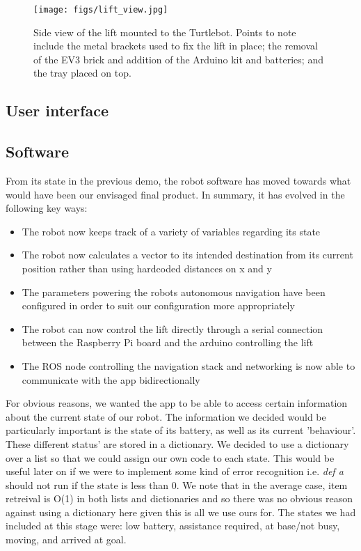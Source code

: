 \documentclass{article}
\begin{document}
\begin{figure}
  \begin{center}
    \texttt{[image: figs/lift\_view.jpg]}
    \caption{Side view of the lift mounted to the Turtlebot. Points to note include the metal brackets used to fix the lift in place; the removal of the EV3 brick and addition of the Arduino kit and batteries; and the tray placed on top.}
  \label{fig:lift}
  \end{center}
\end{figure}

\subsection{User interface}

\subsection{Software}

From its state in the previous demo, the robot software has moved towards what would have been our envisaged final product. In summary, it has evolved in the following key ways:

\begin{itemize}
  \item The robot now keeps track of a variety of variables regarding its state
  \item The robot now calculates a vector to its intended destination from its current position rather than using hardcoded distances on x and y
  \item The parameters powering the robots autonomous navigation have been configured in order to suit our configuration more appropriately
  \item The robot can now control the lift directly through a serial connection between the Raspberry Pi board and the arduino controlling the lift
  \item The ROS node controlling the navigation stack and networking is now able to communicate with the app bidirectionally
\end{itemize}

For obvious reasons, we wanted the app to be able to access certain information about the current state of our robot. The information we decided would be particularly important is the state of its battery, as well as its current 'behaviour'. These different status' are stored in a dictionary. We decided to use a dictionary over a list so that we could assign our own code to each state. This would be useful later on if we were to implement some kind of error recognition i.e. {\it def a} should not run if the state is less than 0. We note that in the average case, item retreival is O(1) in both lists and dictionaries and so there was no obvious reason against using a dictionary here given this is all we use ours for. The states we had included at this stage were: low battery, assistance required, at base/not busy, moving, and arrived at goal.
\end{document}
